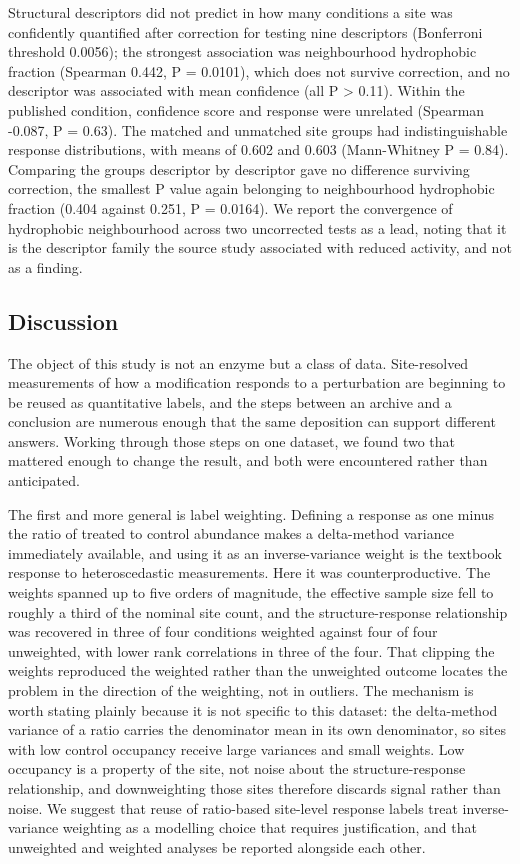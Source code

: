 \documentclass[journal=jprobs,manuscript=article,layout=traditional]{achemso}
\begin{document}
Structural descriptors did not predict in how many conditions a site was confidently quantified after correction for testing nine descriptors (Bonferroni threshold 0.0056); the strongest association was neighbourhood hydrophobic fraction (Spearman 0.442, P = 0.0101), which does not survive correction, and no descriptor was associated with mean confidence (all P > 0.11). Within the published condition, confidence score and response were unrelated (Spearman -0.087, P = 0.63). The matched and unmatched site groups had indistinguishable response distributions, with means of 0.602 and 0.603 (Mann-Whitney P = 0.84). Comparing the groups descriptor by descriptor gave no difference surviving correction, the smallest P value again belonging to neighbourhood hydrophobic fraction (0.404 against 0.251, P = 0.0164). We report the convergence of hydrophobic neighbourhood across two uncorrected tests as a lead, noting that it is the descriptor family the source study associated with reduced activity, and not as a finding.

\subsection{Discussion}

The object of this study is not an enzyme but a class of data. Site-resolved measurements of how a modification responds to a perturbation are beginning to be reused as quantitative labels, and the steps between an archive and a conclusion are numerous enough that the same deposition can support different answers. Working through those steps on one dataset, we found two that mattered enough to change the result, and both were encountered rather than anticipated.

The first and more general is label weighting. Defining a response as one minus the ratio of treated to control abundance makes a delta-method variance immediately available, and using it as an inverse-variance weight is the textbook response to heteroscedastic measurements. Here it was counterproductive. The weights spanned up to five orders of magnitude, the effective sample size fell to roughly a third of the nominal site count, and the structure-response relationship was recovered in three of four conditions weighted against four of four unweighted, with lower rank correlations in three of the four. That clipping the weights reproduced the weighted rather than the unweighted outcome locates the problem in the direction of the weighting, not in outliers. The mechanism is worth stating plainly because it is not specific to this dataset: the delta-method variance of a ratio carries the denominator mean in its own denominator, so sites with low control occupancy receive large variances and small weights. Low occupancy is a property of the site, not noise about the structure-response relationship, and downweighting those sites therefore discards signal rather than noise. We suggest that reuse of ratio-based site-level response labels treat inverse-variance weighting as a modelling choice that requires justification, and that unweighted and weighted analyses be reported alongside each other.
\end{document}
